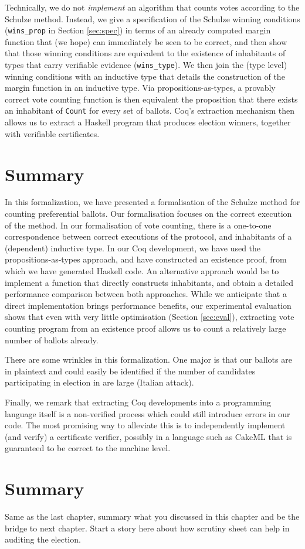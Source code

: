 Technically, we do not \emph{implement} an algorithm that counts
votes according to the Schulze method. Instead, we give a
specification of the Schulze winning conditions 
(\texttt{wins\_prop} in  Section \ref{sec:spec}) in terms of an
already computed margin function that
(we hope) can immediately be seen to be correct, and then show that those
winning conditions are equivalent to the existence of inhabitants of
types that carry verifiable evidence (\texttt{wins\_type}).  We then
join the (type level) winning conditions with an inductive type that
details the construction of the margin function in an inductive
type. Via propositions-as-types, a provably correct vote counting
function is then equivalent the proposition that there exists an
inhabitant of \texttt{Count} for every set of ballots.  Coq's
extraction mechanism then allows us to extract a Haskell program
that produces election winners, together with verifiable
certificates. 

\section{Summary}

In this formalization, we have presented a formalisation of 
the Schulze method for
counting preferential ballots. Our formalisation focuses on the
correct execution of the method. 
In our formalisation of vote counting, there is a one-to-one
correspondence between correct executions of the protocol, and
inhabitants of a (dependent) inductive type. In our Coq development,
we have used the propositions-as-types approach, and have
constructed an existence proof, from which we have generated Haskell
code. An alternative approach would be to implement a function that
directly constructs inhabitants, and obtain a detailed performance
comparison between both approaches. While we anticipate that a
direct implementation brings performance benefits, our experimental
evaluation shows that even with very little optimisation (Section
\ref{sec:eval}), extracting
vote counting program from an existence proof allows us to count a
relatively large number of ballots already.


There are some wrinkles in this formalization. One major is 
that our ballots are in plaintext and could easily be identified
if the number of candidates participating in election in 
are large (Italian attack).

Finally, we remark that extracting Coq developments into a
programming language itself is a non-verified process which could
still introduce errors in our code. The most promising way to
alleviate this is to independently implement (and verify) a
certificate verifier, possibly in a language such as CakeML
\cite{Kumar:2014:CVI} that is guaranteed to
be correct to the machine level. 


 
\section{Summary}
Same as the last chapter, summary what you discussed in this chapter and
be the bridge to next chapter. Start a story here about how scrutiny sheet 
can help in auditing the election.